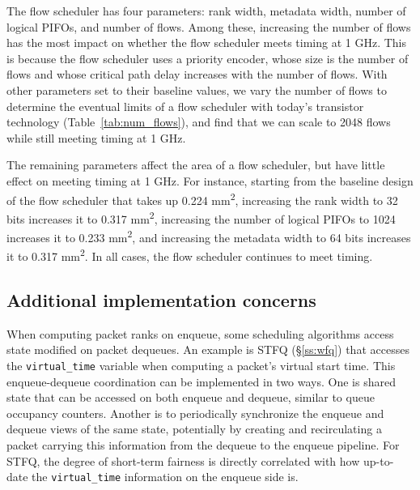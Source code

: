 The flow scheduler has four parameters: rank width, metadata width, number of
logical PIFOs, and number of flows. Among these, increasing the number of flows
has the most impact on whether the flow scheduler meets timing at 1 GHz.  This
is because the flow scheduler uses a priority encoder, whose size is
the number of flows and whose critical path delay increases with the number of
flows. With other parameters set to their baseline values, we vary the number
of flows to determine the eventual limits of a flow scheduler with today's
transistor technology (Table~\ref{tab:num_flows}), and find that we can scale
to 2048 flows while still meeting timing at 1 GHz.

The remaining parameters affect the area of a flow scheduler, but have
little effect on meeting timing at 1 GHz. For instance, starting from
the baseline design of the flow scheduler that takes up 0.224
\si{\milli\metre\squared}, increasing the rank width to 32 bits increases it
 to 0.317 \si{\milli\metre\squared}, increasing the number of logical
PIFOs to 1024 increases it to 0.233 \si{\milli\metre\squared}, and
increasing the metadata width to 64 bits increases it to 0.317
\si{\milli\metre\squared}. In all cases, the flow scheduler continues to meet timing.


\subsection{Additional implementation concerns}
\label{ss:add_impl}

When computing packet ranks on enqueue, some scheduling algorithms access state
modified on packet dequeues. An example is STFQ (\S\ref{ss:wfq}) that accesses
the \texttt{virtual\_time} variable when computing a packet's virtual start
time. This enqueue-dequeue coordination can be implemented in two ways.  One is
shared state that can be accessed on both enqueue and dequeue, similar to queue
occupancy counters. Another is to periodically synchronize the enqueue and
dequeue views of the same state, potentially by creating and recirculating a
packet carrying this information from the dequeue to the enqueue pipeline.  For
STFQ, the degree of short-term fairness is directly correlated with how
up-to-date the \texttt{virtual\_time} information on the enqueue side is.

